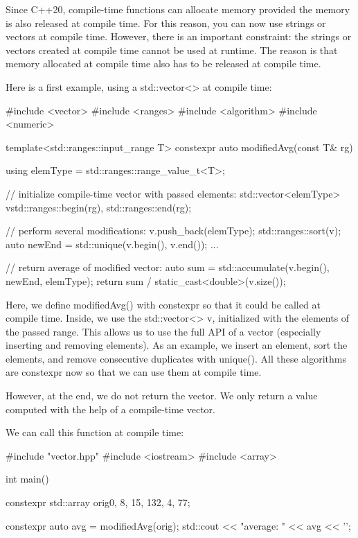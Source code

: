 
Since C++20, compile-time functions can allocate memory provided the memory is also released at compile time. For this reason, you can now use strings or vectors at compile time. However, there is an important constraint: the strings or vectors created at compile time cannot be used at runtime. The reason is that memory allocated at compile time also has to be released at compile time.


Here is a first example, using a std::vector<> at compile time:


\begin{cpp}
#include <vector>
#include <ranges>
#include <algorithm>
#include <numeric>

template<std::ranges::input_range T>
constexpr auto modifiedAvg(const T& rg)
{
	using elemType = std::ranges::range_value_t<T>;
	
	// initialize compile-time vector with passed elements:
	std::vector<elemType> v{std::ranges::begin(rg),
							std::ranges::end(rg)};
		
	// perform several modifications:
	v.push_back(elemType{});
	std::ranges::sort(v);
	auto newEnd = std::unique(v.begin(), v.end());
	...
	
	// return average of modified vector:
	auto sum = std::accumulate(v.begin(), newEnd,
								elemType{});
	return sum / static_cast<double>(v.size());
}
\end{cpp}

Here, we define modifiedAvg() with constexpr so that it could be called at compile time. Inside, we use the std::vector<> v, initialized with the elements of the passed range. This allows us to use the full API of a vector (especially inserting and removing elements). As an example, we insert an element, sort the elements, and remove consecutive duplicates with unique(). All these algorithms are constexpr now so that we can use them at compile time.

However, at the end, we do not return the vector. We only return a value computed with the help of a compile-time vector.

We can call this function at compile time:


\begin{cpp}
#include "vector.hpp"
#include <iostream>
#include <array>

int main()
{
	constexpr std::array orig{0, 8, 15, 132, 4, 77};
	
	constexpr auto avg = modifiedAvg(orig);
	std::cout << "average: " << avg << '\n';
}
\end{cpp}

